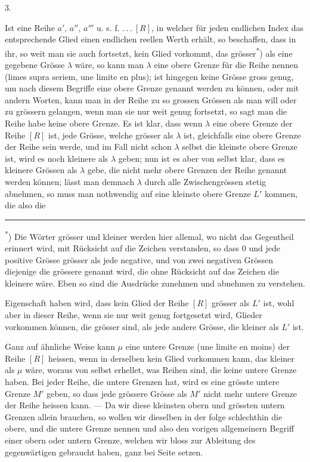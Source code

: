 \begin{center}3.\end{center}
\noindent\hspace*{\parindent}Ist eine Reihe \(a',\,a'',\,a'''\) u. s. f. \({.}\,{.}\,{.}\ [R]\), in welcher für jeden endlichen Index das entsprechende Glied einen endlichen reellen Werth erhält, so beschaffen, dass in ihr, so weit man sie auch fortsetzt, kein Glied vorkommt, das grösser\textsuperscript{*}) als eine gegebene Grösse \(\lambda\) wäre, so kann man \(\lambda\) eine obere Grenze für die Reihe nennen (limes supra seriem, une limite en plus); ist hingegen keine Grösse gross genug, um nach diesem Begriffe eine obere Grenze genannt werden zu können, oder mit andern Worten, kann man in der Reihe zu so grossen Grössen als man will oder zu grössern gelangen, wenn man sie nur weit genug fortsetzt, so sagt man die Reihe habe keine obere Grenze. Es ist klar, dass wenn \(\lambda\) eine obere Grenze der Reihe \([R]\) ist, jede Grösse, welche grösser als \(\lambda\) ist, gleichfalls eine obere Grenze der Reihe sein werde, und im Fall nicht schon \(\lambda\) selbst die kleinste obere Grenze ist, wird es noch kleinere als \(\lambda\) geben; nun ist es aber von selbst klar, dass es kleinere Grössen als \(\lambda\) gebe, die nicht mehr obere Grenzen der Reihe genannt werden können; lässt man demnach \(\lambda\) durch alle Zwischengrössen stetig abnehmen, so muss man nothwendig auf eine kleinste obere Grenze \(L'\) kommen, die also die
\par\medskip\noindent\rule{.24\linewidth}{.4pt}\par\smallskip
{\small\noindent\hspace*{\parindent}\textsuperscript{*}) Die Wörter grösser und kleiner werden hier allemal, wo nicht das Gegentheil erinnert wird, mit Rücksicht auf die Zeichen verstanden, so dass 0 und jede positive Grösse grösser als jede negative, und von zwei negativen Grössen diejenige die grössere genannt wird, die ohne Rücksicht auf das Zeichen die kleinere wäre. Eben so sind die Ausdrücke zunehmen und abnehmen zu verstehen.\par}
\clearpage{}
\noindent Eigenschaft haben wird, dass kein Glied der Reihe \([R]\) grösser als \(L'\) ist, wohl aber in dieser Reihe, wenn sie nur weit genug fortgesetzt wird, Glieder vorkommen können, die grösser sind, als jede andere Grösse, die kleiner als \(L'\) ist.

\indent Ganz auf ähnliche Weise kann \(\mu\) eine untere Grenze (une limite en moins) der Reihe \([R]\) heissen, wenn in derselben kein Glied vorkommen kann, das kleiner als \(\mu\) wäre, woraus von selbst erhellet, was Reihen sind, die keine untere Grenze haben. Bei jeder Reihe, die untere Grenzen hat, wird es eine grösste untere Grenze \(M'\) geben, so dass jede grössere Grösse als \(M'\) nicht mehr untere Grenze der Reihe heissen kann. — Da wir diese kleinsten obern und grössten untern Grenzen allein brauchen, so wollen wir dieselben in der folge schlechthin die obere, und die untere Grenze nennen und also den vorigen allgemeinern Begriff einer obern oder untern Grenze, welchen wir bloss zur Ableitung des gegenwärtigen gebraucht haben, ganz bei Seite setzen.

